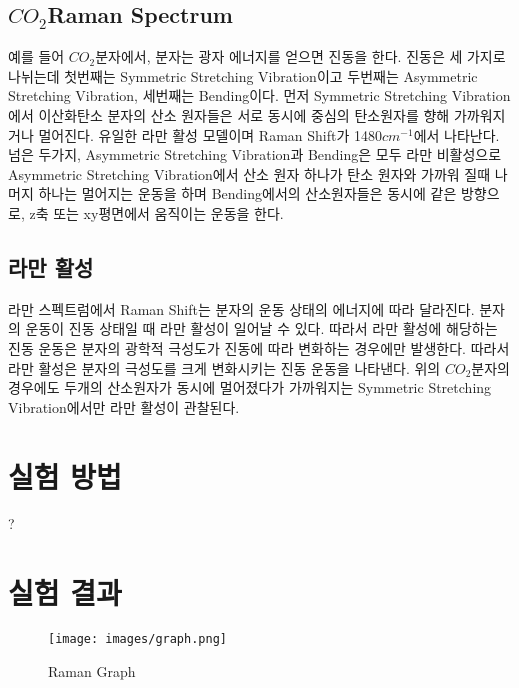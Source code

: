 \documentclass{report}
\begin{document}
\subsection{$CO_2$Raman Spectrum}
예를 들어 $CO_2$분자에서, 분자는 광자 에너지를 얻으면 진동을 한다. 진동은 세 가지로 나뉘는데 첫번째는 Symmetric Stretching Vibration이고 두번째는 Asymmetric Stretching Vibration, 세번째는 Bending이다. 먼저 Symmetric Stretching Vibration에서 이산화탄소 분자의 산소 원자들은 서로 동시에 중심의 탄소원자를 향해 가까워지거나 멀어진다. 유일한 라만 활성 모델이며 Raman Shift가 1480$cm^{-1}$에서 나타난다.\\
넘은 두가지, Asymmetric Stretching Vibration과 Bending은 모두 라만 비활성으로 Asymmetric Stretching Vibration에서 산소 원자 하나가 탄소 원자와 가까워 질때 나머지 하나는 멀어지는 운동을 하며 Bending에서의 산소원자들은 동시에 같은 방향으로, z축 또는 xy평면에서 움직이는 운동을 한다.\cite{2023Raman, Penney74} \\

\subsection{라만 활성}
라만 스펙트럼에서 Raman Shift는 분자의 운동 상태의 에너지에 따라 달라진다. 분자의 운동이 진동 상태일 때 라만 활성이 일어날 수 있다. 따라서 라만 활성에 해당하는 진동 운동은 분자의 광학적 극성도가 진동에 따라 변화하는 경우에만 발생한다. 따라서 라만 활성은 분자의 극성도를 크게 변화시키는 진동 운동을 나타낸다. 위의 $CO_2$분자의 경우에도 두개의 산소원자가 동시에 멀어졌다가 가까워지는 Symmetric Stretching Vibration에서만 라만 활성이 관찰된다.\cite{2020Raman, Prochazka2016} \\

\section{실험 방법}
?

\section{실험 결과}



\begin{figure}[!h]
    \centering
    \texttt{[image: images/graph.png]}
    \caption{Raman Graph}
    \label{fig:Raman Graph}
\end{figure}
\ \\
\end{document}
